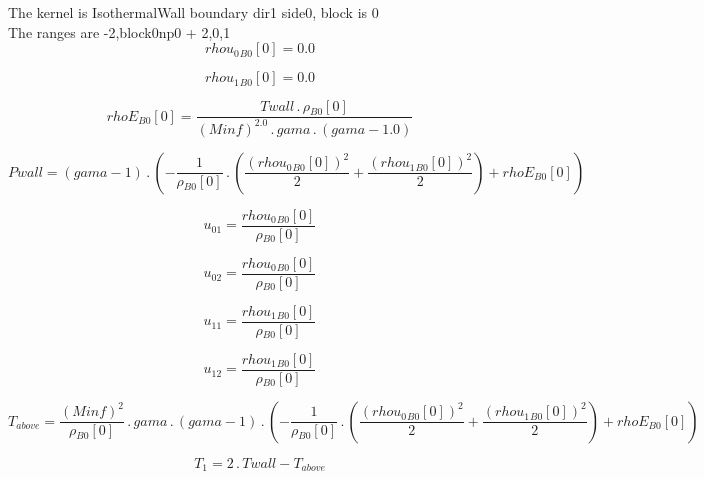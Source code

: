 \documentclass{article}
\begin{document}
\noindent The kernel is IsothermalWall boundary dir1 side0, block is 0\\\noindent The ranges are -2,block0np0 + 2,0,1\\\begin{dmath}{rhou_{0}{_{B0}}}[{0}] = 0.0\end{dmath}

\begin{dmath}{rhou_{1}{_{B0}}}[{0}] = 0.0\end{dmath}

\begin{dmath}{rhoE{_{B0}}}[{0}] = \frac{Twall \,.\, {\rho{_{B0}}}[{0}]}{\left(Minf \right)^{2.0} \,.\, gama \,.\, \left(gama - 1.0\right)}\end{dmath}

\begin{dmath}Pwall = \left(gama - 1\right) \,.\, \left(- \frac{1}{{\rho{_{B0}}}[{0}]} \,.\, \left(\frac{\left({rhou_{0}{_{B0}}}[{0}] \right)^{2}}{2} + \frac{\left({rhou_{1}{_{B0}}}[{0}] \right)^{2}}{2}\right) + {rhoE{_{B0}}}[{0}]\right)\end{dmath}

\begin{dmath}u_{01} = \frac{{rhou_{0}{_{B0}}}[{0}]}{{\rho{_{B0}}}[{0}]}\end{dmath}

\begin{dmath}u_{02} = \frac{{rhou_{0}{_{B0}}}[{0}]}{{\rho{_{B0}}}[{0}]}\end{dmath}

\begin{dmath}u_{11} = \frac{{rhou_{1}{_{B0}}}[{0}]}{{\rho{_{B0}}}[{0}]}\end{dmath}

\begin{dmath}u_{12} = \frac{{rhou_{1}{_{B0}}}[{0}]}{{\rho{_{B0}}}[{0}]}\end{dmath}

\begin{dmath}T_{above} = \frac{\left(Minf \right)^{2}}{{\rho{_{B0}}}[{0}]} \,.\, gama \,.\, \left(gama - 1\right) \,.\, \left(- \frac{1}{{\rho{_{B0}}}[{0}]} \,.\, \left(\frac{\left({rhou_{0}{_{B0}}}[{0}] \right)^{2}}{2} + 
\frac{\left({rhou_{1}{_{B0}}}[{0}] \right)^{2}}{2}\right) + {rhoE{_{B0}}}[{0}]\right)\end{dmath}

\begin{dmath}T_{1} = 2 \,.\, Twall - T_{above}\end{dmath}
\end{document}

